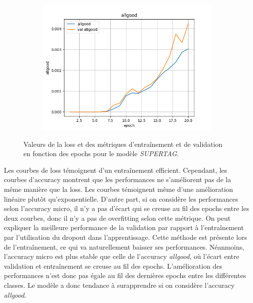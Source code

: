 \documentclass[a4paper]{article}
\begin{document}
\begin{figure}[H]
\begin{subfigure}{0.32\textwidth}
    \end{subfigure}
    \begin{subfigure}{0.32\textwidth}
        \centering
        \includegraphics[width=\linewidth]{../logs/supertag/allgood.png}
    \end{subfigure}
    \caption{Valeurs de la loss et des métriques d'entraînement et de validation en fonction des epochs 
            pour le modèle \textit{SUPERTAG}.}
    \label{fig: results supertag}
\end{figure}

Les courbes de loss témoignent d'un entraînement efficient. Cependant, les courbes d'accuracy montrent que les performances ne
s'améliorent pas de la même manière que la loss. Les courbes témoignent même d'une amélioration linéaire plutôt qu'exponentielle.
D'autre part, si on considère les performances selon l'accuracy micro, il n'y a pas d'écart qui
se creuse au fil des epochs entre les deux courbes, donc il n'y a pas de overfitting selon cette métrique. On peut expliquer la meilleure performance
de la validation par rapport à l'entraînement par l'utilisation du dropout dans l'apprentissage. Cette méthode est présente lors
de l'entraînement, ce qui va naturellement baisser ses performances. 
Néanmoins, l'accuracy micro est plus stable que celle de l'accuracy \textit{allgood}, où l'écart entre validation et entraînement se creuse au fil des epochs. L'amélioration des performances
n'est donc pas égale au fil des dernières epochs entre les différentes classes. Le modèle a donc tendance à surapprendre si on considère l'accuracy \textit{allgood}. 
\end{document}
